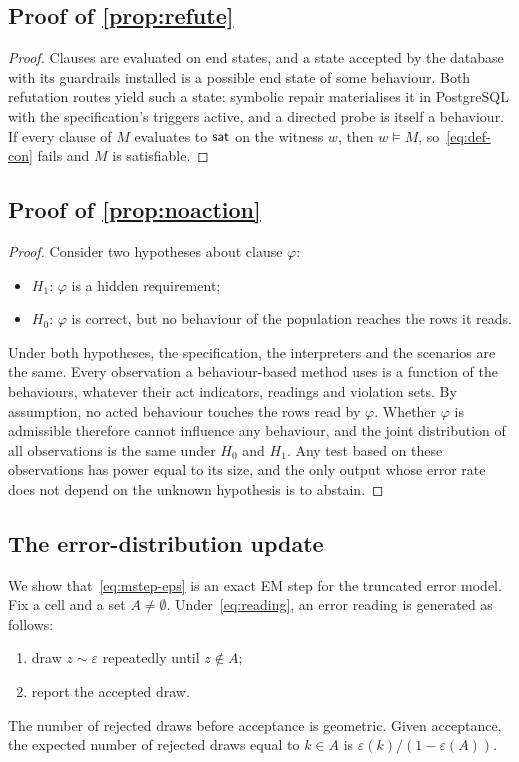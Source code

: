 \subsection{Proof of \cref{prop:refute}}

\begin{proof}
Clauses are evaluated on end states, and a state accepted by the database with its guardrails installed is a possible end state of some behaviour. Both refutation routes yield such a state: symbolic repair materialises it in PostgreSQL with the specification's triggers active, and a directed probe is itself a behaviour. If every clause of $M$ evaluates to $\textsf{sat}$ on the witness $w$, then $w\models M$, so~\eqref{eq:def-con} fails and $M$ is satisfiable.
\end{proof}

\subsection{Proof of \cref{prop:noaction}}

\begin{proof}
Consider two hypotheses about clause $\varphi$:
\begin{itemize}[leftmargin=*]
\item $H_1$: $\varphi$ is a hidden requirement;
\item $H_0$: $\varphi$ is correct, but no behaviour of the population reaches the rows it reads.
\end{itemize}
Under both hypotheses, the specification, the interpreters and the scenarios are the same. Every observation a behaviour-based method uses is a function of the behaviours, whatever their act indicators, readings and violation sets. By assumption, no acted behaviour touches the rows read by $\varphi$. Whether $\varphi$ is admissible therefore cannot influence any behaviour, and the joint distribution of all observations is the same under $H_0$ and $H_1$. Any test based on these observations has power equal to its size, and the only output whose error rate does not depend on the unknown hypothesis is to abstain.
\end{proof}

\subsection{The error-distribution update}
\label{app:em}

We show that~\eqref{eq:mstep-eps} is an exact EM step for the truncated error model. Fix a cell and a set $A\neq\emptyset$. Under~\eqref{eq:reading}, an error reading is generated as follows:
\begin{enumerate}[leftmargin=*]
\item draw $z\sim\varepsilon$ repeatedly until $z\notin A$;
\item report the accepted draw.
\end{enumerate}
The number of rejected draws before acceptance is geometric. Given acceptance, the expected number of rejected draws equal to $k\in A$ is $\varepsilon(k)/(1-\varepsilon(A))$.

